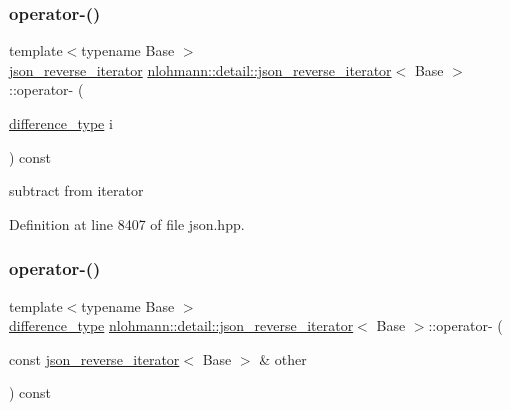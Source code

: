 \subsubsection{\texorpdfstring{operator-\/()}{operator-()}\hspace{0.1cm}{\footnotesize\ttfamily [1/2]}}
{\footnotesize\ttfamily template$<$typename Base $>$ \\
\mbox{\hyperlink{classnlohmann_1_1detail_1_1json__reverse__iterator}{json\+\_\+reverse\+\_\+iterator}} \mbox{\hyperlink{classnlohmann_1_1detail_1_1json__reverse__iterator}{nlohmann\+::detail\+::json\+\_\+reverse\+\_\+iterator}}$<$ Base $>$\+::operator-\/ (\begin{DoxyParamCaption}\item[{\mbox{\hyperlink{classnlohmann_1_1detail_1_1json__reverse__iterator_a9ab55987c05ec6427ad36082e351cc45}{difference\+\_\+type}}}]{i }\end{DoxyParamCaption}) const\hspace{0.3cm}{\ttfamily [inline]}}



subtract from iterator 



Definition at line 8407 of file json.\+hpp.

\mbox{\label{classnlohmann_1_1detail_1_1json__reverse__iterator_aaaa6c0b1d74e74e35e5f7b56dfd6c5d1}} 
\subsubsection{\texorpdfstring{operator-\/()}{operator-()}\hspace{0.1cm}{\footnotesize\ttfamily [2/2]}}
{\footnotesize\ttfamily template$<$typename Base $>$ \\
\mbox{\hyperlink{classnlohmann_1_1detail_1_1json__reverse__iterator_a9ab55987c05ec6427ad36082e351cc45}{difference\+\_\+type}} \mbox{\hyperlink{classnlohmann_1_1detail_1_1json__reverse__iterator}{nlohmann\+::detail\+::json\+\_\+reverse\+\_\+iterator}}$<$ Base $>$\+::operator-\/ (\begin{DoxyParamCaption}\item[{const \mbox{\hyperlink{classnlohmann_1_1detail_1_1json__reverse__iterator}{json\+\_\+reverse\+\_\+iterator}}$<$ Base $>$ \&}]{other }\end{DoxyParamCaption}) const\hspace{0.3cm}{\ttfamily [inline]}}




